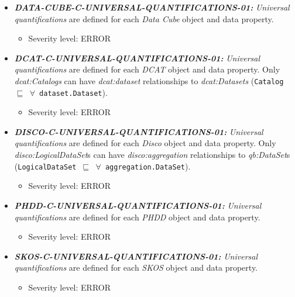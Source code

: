 \documentclass{llncs}
\newcommand{\ms}[1]{\texttt{#1}}
\begin{document}
\begin{itemize}
	\item \textbf{{\em DATA-CUBE-C-UNIVERSAL-QUANTIFICATIONS-01:}}
	\emph{Universal quantifications} are defined for each \emph{Data Cube} object and data property.
	\begin{itemize}
		\item Severity level: ERROR
	\end{itemize}
\end{itemize}

\begin{itemize}
	\item \textbf{{\em DCAT-C-UNIVERSAL-QUANTIFICATIONS-01:}}
	\emph{Universal quantifications} are defined for each \emph{DCAT} object and data property.
	Only {\em dcat:Catalogs} can have {\em dcat:dataset} relationships to {\em dcat:Datasets} (\ms{Catalog $\sqsubseteq$ $\forall$ dataset.Dataset}).
	\begin{itemize}
		\item Severity level: ERROR
	\end{itemize}
\end{itemize}

\begin{itemize}
	\item \textbf{{\em DISCO-C-UNIVERSAL-QUANTIFICATIONS-01:}}
	\emph{Universal quantifications} are defined for each \emph{Disco} object and data property.
  Only {\em disco:LogicalDataSet}s can have {\em disco:aggregation} relationships to {\em qb:DataSet}s (\ms{LogicalDataSet $\sqsubseteq$ $\forall$ aggregation.DataSet}).
	\begin{itemize}
		\item Severity level: ERROR
	\end{itemize}
\end{itemize}

\begin{itemize}
	\item \textbf{{\em PHDD-C-UNIVERSAL-QUANTIFICATIONS-01:}}
	\emph{Universal quantifications} are defined for each \emph{PHDD} object and data property.
	\begin{itemize}
		\item Severity level: ERROR
	\end{itemize}
\end{itemize}

\begin{itemize}
	\item \textbf{{\em SKOS-C-UNIVERSAL-QUANTIFICATIONS-01:}}
	\emph{Universal quantifications} are defined for each \emph{SKOS} object and data property.
	\begin{itemize}
		\item Severity level: ERROR
	\end{itemize}
\end{itemize}
\end{document}
